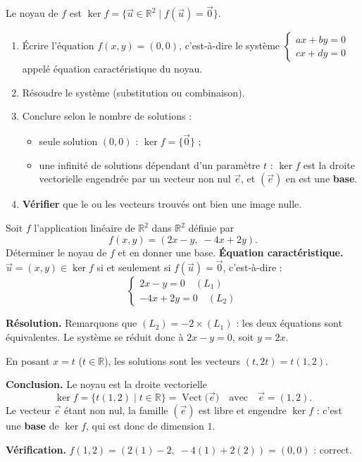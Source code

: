 \documentclass[11pt]{article}
\newcommand{\cle}[1]{{\popxbold\color{popdark}#1}}
\begin{document}
\begin{methode}
Le \cle{noyau} de $f$ est $\ker f = \{\vec{u} \in \mathbb{R}^2 \mid f(\vec{u}) = \vec{0}\}$.
\begin{enumerate}
\item Écrire l'équation $f(x, y) = (0, 0)$, c'est-à-dire le système $\begin{cases} ax + by = 0 \\ cx + dy = 0 \end{cases}$ appelé \cle{équation caractéristique} du noyau.
\item Résoudre le système (substitution ou combinaison).
\item Conclure selon le nombre de solutions :
\begin{itemize}
\item seule solution $(0,0)$ : $\ker f = \{\vec{0}\}$ ;
\item une infinité de solutions dépendant d'un paramètre $t$ : $\ker f$ est la droite vectorielle engendrée par un vecteur non nul $\vec{e}$, et $(\vec{e})$ en est une \textbf{base}.
\end{itemize}
\item \textbf{Vérifier} que le ou les vecteurs trouvés ont bien une image nulle.
\end{enumerate}
\end{methode}

\begin{exoresolu}
Soit $f$ l'application linéaire de $\mathbb{R}^2$ dans $\mathbb{R}^2$ définie par
\[ f(x, y) = (2x - y,\; -4x + 2y). \]
Déterminer le noyau de $f$ et en donner une base.
\tcblower
\textbf{Équation caractéristique.} $\vec{u} = (x, y) \in \ker f$ si et seulement si $f(\vec{u}) = \vec{0}$, c'est-à-dire :
\[ \begin{cases} 2x - y = 0 \quad (L_1) \\ -4x + 2y = 0 \quad (L_2) \end{cases} \]

\textbf{Résolution.} Remarquons que $(L_2) = -2 \times (L_1)$ : les deux équations sont équivalentes. Le système se réduit donc à $2x - y = 0$, soit $y = 2x$.

En posant $x = t$ ($t \in \mathbb{R}$), les solutions sont les vecteurs $(t, 2t) = t(1, 2)$.

\textbf{Conclusion.} Le noyau est la droite vectorielle
\[ \ker f = \{ t(1, 2) \mid t \in \mathbb{R} \} = \operatorname{Vect}\big(\vec{e}\big) \quad \text{avec} \quad \vec{e} = (1, 2). \]
Le vecteur $\vec{e}$ étant non nul, la famille $(\vec{e})$ est libre et engendre $\ker f$ : c'est une \textbf{base} de $\ker f$, qui est donc de dimension $1$.

\textbf{Vérification.} $f(1, 2) = (2(1) - 2,\; -4(1) + 2(2)) = (0, 0)$ : correct.
\end{exoresolu}
\end{document}
